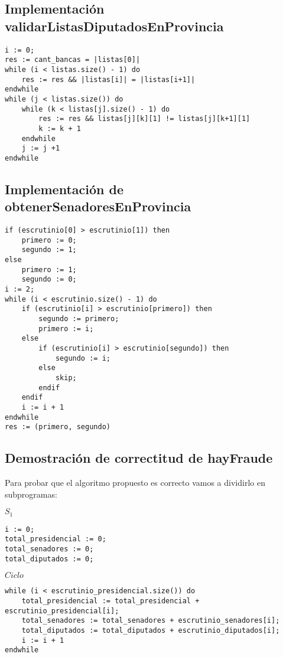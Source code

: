 \documentclass[10pt,a4paper]{article}
\begin{document}
\subsection{Implementación validarListasDiputadosEnProvincia}

	\begin{lstlisting}[caption={},label=code:for]
i := 0;
res := cant_bancas = |listas[0]|
while (i < listas.size() - 1) do
	res := res && |listas[i]| = |listas[i+1]|
endwhile
while (j < listas.size()) do
	while (k < listas[j].size() - 1) do
		res := res && listas[j][k][1] != listas[j][k+1][1]
		k := k + 1
	endwhile
	j := j +1
endwhile
	\end{lstlisting}

\subsection{Implementación de obtenerSenadoresEnProvincia}

	\begin{lstlisting}[caption={},label=code:for]
if (escrutinio[0] > escrutinio[1]) then
	primero := 0;
	segundo := 1;
else
	primero := 1;
	segundo := 0;
i := 2;
while (i < escrutinio.size() - 1) do
	if (escrutinio[i] > escrutinio[primero]) then
		segundo := primero;
		primero := i;
	else
		if (escrutinio[i] > escrutinio[segundo]) then
			segundo := i;
		else
			skip;
		endif
	endif
	i := i + 1
endwhile
res := (primero, segundo)
	\end{lstlisting}


\subsection{Demostración de correctitud de hayFraude}



Para probar que el algoritmo propuesto es correcto vamos a dividirlo en subprogramas:

\vspace{0.3cm}

$S_1$
	\begin{lstlisting}[caption={},label=code:for]
i := 0;
total_presidencial := 0;
total_senadores := 0;
total_diputados := 0;
	\end{lstlisting}

\vspace{0.3cm}

$Ciclo$
	\begin{lstlisting}[caption={},label=code:for]
while (i < escrutinio_presidencial.size()) do
	total_presidencial := total_presidencial + escrutinio_presidencial[i];
	total_senadores := total_senadores + escrutinio_senadores[i];
	total_diputados := total_diputados + escrutinio_diputados[i];
	i := i + 1
endwhile
	\end{lstlisting}
\end{document}
